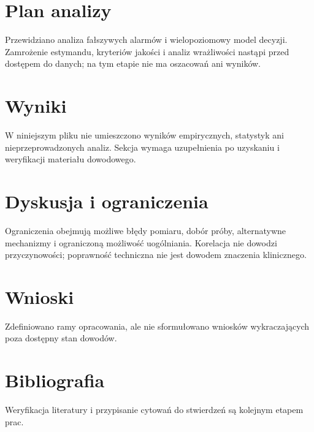 \documentclass[11pt,a4paper]{article}
\begin{document}
\section{Plan analizy}

Przewidziano analiza fałszywych alarmów i wielopoziomowy model decyzji. Zamrożenie estymandu, kryteriów jakości i analiz wrażliwości nastąpi przed dostępem do danych; na tym etapie nie ma oszacowań ani wyników.

\section{Wyniki}

W niniejszym pliku nie umieszczono wyników empirycznych, statystyk ani nieprzeprowadzonych analiz. Sekcja wymaga uzupełnienia po uzyskaniu i weryfikacji materiału dowodowego.

\section{Dyskusja i ograniczenia}

Ograniczenia obejmują możliwe błędy pomiaru, dobór próby, alternatywne mechanizmy i ograniczoną możliwość uogólniania. Korelacja nie dowodzi przyczynowości; poprawność techniczna nie jest dowodem znaczenia klinicznego.

\section{Wnioski}

Zdefiniowano ramy opracowania, ale nie sformułowano wniosków wykraczających poza dostępny stan dowodów.

\section*{Bibliografia}

Weryfikacja literatury i przypisanie cytowań do stwierdzeń są kolejnym etapem prac.
\end{document}

